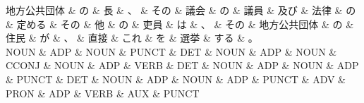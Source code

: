 \documentclass[tikz,border=5pt]{standalone}
\begin{document}
\normalsize
\begin{dependency}[edge unit distance=12.0pt]
    \begin{deptext}[column sep=1em]
        地方公共団体 \& の \& 長 \& 、 \& その \& 議会 \& の \& 議員 \& 及び \& 法律 \& の \& 定める \& その \& 他 \& の \& 吏員 \& は \& 、 \& その \& 地方公共団体 \& の \& 住民 \& が \& 、 \& 直接 \& これ \& を \& 選挙 \& する \& 。\\
        NOUN \& ADP \& NOUN \& PUNCT \& DET \& NOUN \& ADP \& NOUN \& CCONJ \& NOUN \& ADP \& VERB \& DET \& NOUN \& ADP \& NOUN \& ADP \& PUNCT \& DET \& NOUN \& ADP \& NOUN \& ADP \& PUNCT \& ADV \& PRON \& ADP \& VERB \& AUX \& PUNCT\\
    \end{deptext}
\end{dependency}
\end{document}
